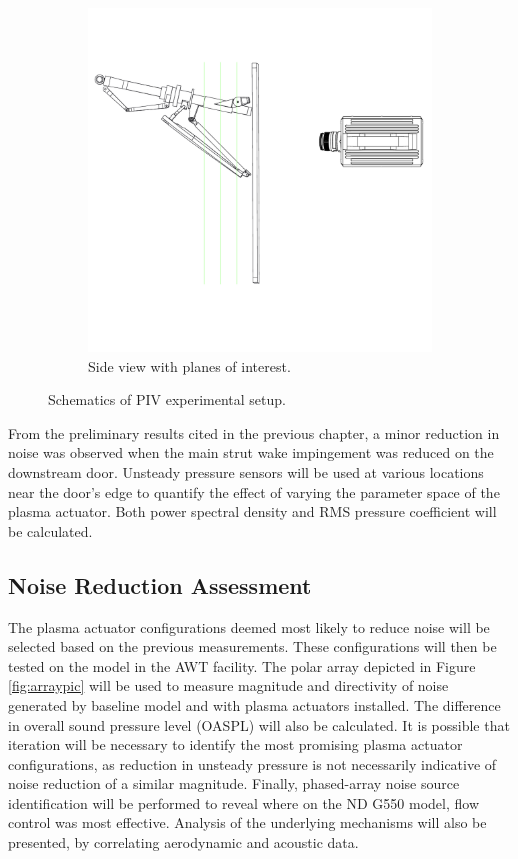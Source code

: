 \begin{figure}
\begin{center}
\begin{subfigure}{0.6\textwidth}
\includegraphics[width=\linewidth]{figures/piv_side}
\caption{Side view with planes of interest.}
\label{fig:piv_side}
\end{subfigure}
\caption{Schematics of PIV experimental setup.}
\label{fig:cad}
\end{center}
\end{figure}



From the preliminary results cited in the previous chapter, a minor reduction in noise was observed when the main strut wake impingement was reduced on the downstream door. Unsteady pressure sensors will be used at various locations near the door's edge to quantify the effect of varying the parameter space of the plasma actuator. Both power spectral density and RMS pressure coefficient will be calculated.

\subsection{Noise Reduction Assessment}
The plasma actuator configurations deemed most likely to reduce noise will be selected based on the previous measurements. These configurations will then be tested on the model in the AWT facility. 
The polar array depicted in Figure \ref{fig:arraypic} will be used to measure magnitude and directivity of noise generated by baseline model and with plasma actuators installed. The difference in overall sound pressure level (OASPL) will also be calculated.
It is possible that iteration will be necessary to identify the most promising plasma actuator configurations, as reduction in unsteady pressure is not necessarily indicative of noise reduction of a similar magnitude. 
Finally, phased-array noise source identification will be performed to reveal where on the ND G550 model, flow control was most effective. Analysis of the underlying mechanisms will also be presented, by correlating aerodynamic and acoustic data.

